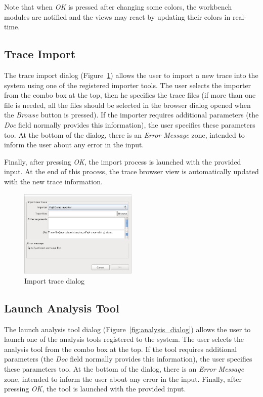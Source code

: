 \documentclass[twoside]{article}
\begin{document}
\begin{sloppypar}
Note that when \emph{OK} is pressed after changing some colors, the workbench modules are notified and the views may react by updating their colors in real-time.

\subsection{Trace Import}
\label{subsec:import}

The trace import dialog (Figure~\ref{fig:import_dialog}) allows the user to import a new trace into the system using one of the registered importer tools.
The user selects the importer from the combo box at the top, then he specifies the trace files (if more than one file is needed, all the files should be selected in the browser dialog opened when the \emph{Browse} button is pressed). 
If the importer requires additional parameters (the \emph{Doc} field normally provides this information), the user specifies these parameters too.
At the bottom of the dialog, there is an \emph{Error Message} zone, intended to inform the user about any error in the input.

Finally, after pressing \emph{OK}, the import process is launched with the provided input.
At the end of this process, the trace browser view is automatically updated with the new trace information.

\begin{figure}[h!]
  \centering
    \includegraphics[width=0.5\textwidth]{images/import_dialog.png}
  \caption{Import trace dialog}
  \label{fig:import_dialog}
\end{figure}

\subsection{Launch Analysis Tool}
\label{subsec:analysis}

The launch analysis tool dialog (Figure~\ref{fig:analysis_dialog}) allows the user to launch one of the analysis tools registered to the system.
The user selects the analysis tool from the combo box at the top. 
If the tool requires additional parameters (the \emph{Doc} field normally provides this information), the user specifies these parameters too. 
At the bottom of the dialog, there is an \emph{Error Message} zone, intended to inform the user about any error in the input.
Finally, after pressing \emph{OK}, the tool is launched with the provided input. 


\end{sloppypar}
\end{document}
